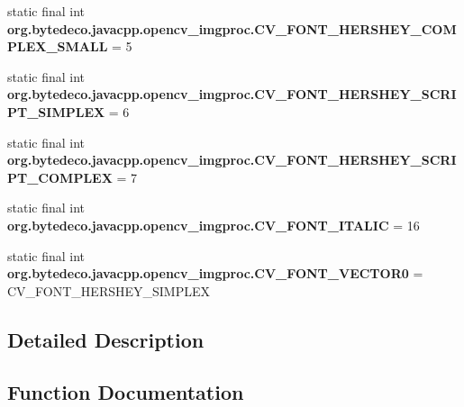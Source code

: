 \begin{DoxyCompactItemize}
\item 
\mbox{\label{group__imgproc__c_ga9cc705d8a7a154b4c4f7e107e837f1a2}} 
static final int {\bfseries org.\+bytedeco.\+javacpp.\+opencv\+\_\+imgproc.\+C\+V\+\_\+\+F\+O\+N\+T\+\_\+\+H\+E\+R\+S\+H\+E\+Y\+\_\+\+C\+O\+M\+P\+L\+E\+X\+\_\+\+S\+M\+A\+LL} = 5
\item 
\mbox{\label{group__imgproc__c_ga11c753efd06d3914a32259334e41b854}} 
static final int {\bfseries org.\+bytedeco.\+javacpp.\+opencv\+\_\+imgproc.\+C\+V\+\_\+\+F\+O\+N\+T\+\_\+\+H\+E\+R\+S\+H\+E\+Y\+\_\+\+S\+C\+R\+I\+P\+T\+\_\+\+S\+I\+M\+P\+L\+EX} = 6
\item 
\mbox{\label{group__imgproc__c_gae3f86c89bcd2b38e8ccb5a6c1598e02a}} 
static final int {\bfseries org.\+bytedeco.\+javacpp.\+opencv\+\_\+imgproc.\+C\+V\+\_\+\+F\+O\+N\+T\+\_\+\+H\+E\+R\+S\+H\+E\+Y\+\_\+\+S\+C\+R\+I\+P\+T\+\_\+\+C\+O\+M\+P\+L\+EX} = 7
\item 
\mbox{\label{group__imgproc__c_gad0cf892b6f65a6fe7cf92324c85e026b}} 
static final int {\bfseries org.\+bytedeco.\+javacpp.\+opencv\+\_\+imgproc.\+C\+V\+\_\+\+F\+O\+N\+T\+\_\+\+I\+T\+A\+L\+IC} = 16
\item 
\mbox{\label{group__imgproc__c_gaea256488106d394131386551a0fbef40}} 
static final int {\bfseries org.\+bytedeco.\+javacpp.\+opencv\+\_\+imgproc.\+C\+V\+\_\+\+F\+O\+N\+T\+\_\+\+V\+E\+C\+T\+O\+R0} = C\+V\+\_\+\+F\+O\+N\+T\+\_\+\+H\+E\+R\+S\+H\+E\+Y\+\_\+\+S\+I\+M\+P\+L\+EX
\end{DoxyCompactItemize}


\subsection{Detailed Description}


\subsection{Function Documentation}
\mbox{\label{group__imgproc__c_ga8808b742ceec81dac792c107ef82fe13}} 
